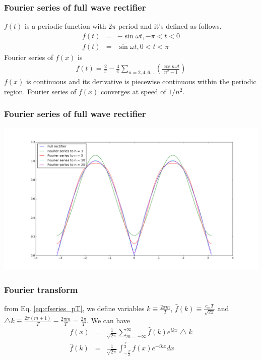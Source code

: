 \documentclass{beamer}
\begin{document}
\begin{frame}
\frametitle{Fourier series of full wave rectifier}
$f(t)$ is a periodic function with $2\pi$ period and it's defined as follows.
\begin{eqnarray}
f(t)&=& -\sin {\omega t}, -\pi < t < 0 \nonumber \\
f(t)&=& \sin {\omega t}, 0 < t < \pi
\label{eq:fullrectifier_func}
\end{eqnarray}
Fourier series of $f(x)$ is
\begin{eqnarray}
f(t)= \frac{2}{\pi} - \frac{4}{\pi} \sum_{n=2,4,6...} \left( \frac{\cos n\omega t}{n^2 - 1} \right)
\label{eq:fullrectifier_func_ft}
\end{eqnarray}
$f(x)$ is continuous and its derivative is piecewise continuous within the periodic region. Fourier series of $f(x)$ converges at speed of $1/n^2$.
\end{frame}
\begin{frame}
\frametitle{Fourier series of full wave rectifier}
\includegraphics[scale=0.3]{fullrectifier.png}
\end{frame}
\begin{frame}
\frametitle{Fourier transform}
from Eq. \ref{eq:cfseries_pT}, we define variables $k \equiv \frac{2\pi m}{T}$, $\hat{f}(k) \equiv\frac{c_mT}{\sqrt{2\pi}}$ and $ \bigtriangleup{k} \equiv \frac{2\pi (m+1)}{T} - \frac{2\pi m}{T} = \frac{2\pi}{T}$. \newline We can have
\begin{eqnarray}
f(x)&=&\frac{1}{\sqrt{2\pi}}\sum_{m=-\infty}^{\infty} \hat{f}(k) e^{ikx} \bigtriangleup{k} \nonumber \\
\hat{f}(k)&=&\frac{1}{\sqrt{2\pi}}\int_{-\frac{T}{2}}^{\frac{T}{2}} f(x) e^{-ikx}dx\nonumber
\end{eqnarray}
\end{frame}
\end{document}
